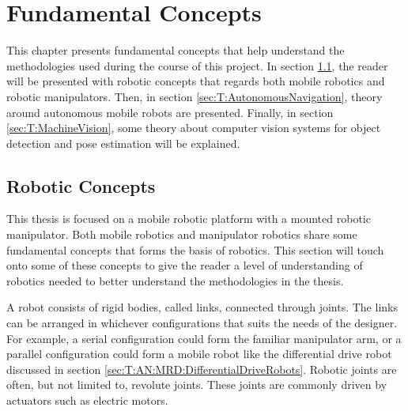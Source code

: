 \chapter{Fundamental Concepts}
This chapter presents fundamental concepts that help understand the methodologies used during the course of this project. In section \ref{sec:T:RoboticConcepts}, the reader will be presented with robotic concepts that regards both mobile robotics and robotic manipulators. Then, in section \ref{sec:T:AutonomousNavigation}, theory around autonomous mobile robots are presented. Finally, in section \ref{sec:T:MachineVision}, some theory about computer vision systems for object detection and pose estimation will be explained. 


\section{Robotic Concepts} \label{sec:T:RoboticConcepts}
This thesis is focused on a mobile robotic platform with a mounted robotic manipulator. Both mobile robotics and manipulator robotics share some fundamental concepts that forms the basis of robotics. This section will touch onto some of these concepts to give the reader a level of understanding of robotics needed to better understand the methodologies in the thesis. 

A robot consists of rigid bodies, called links, connected through joints. The links can be arranged in whichever configurations that suits the needs of the designer. For example, a serial configuration could form the familiar manipulator arm, or a parallel configuration could form a mobile robot like the differential drive robot discussed in section \ref{sec:T:AN:MRD:DifferentialDriveRobots}. Robotic joints are often, but not limited to, revolute joints. These joints are commonly driven by actuators such as electric motors.

